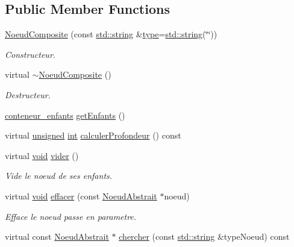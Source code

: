 \subsection*{Public Member Functions}
\begin{DoxyCompactItemize}
\item 
\hyperlink{group__inf2990_ga21f20f8612314721e4e63ea0596d0b42}{Noeud\-Composite} (const \hyperlink{glew_8h_ae84541b4f3d8e1ea24ec0f466a8c568b}{std\-::string} \&\hyperlink{fmod_8h_a5338b9cb3874378d7e5adfbe80a8a381}{type}=\hyperlink{glew_8h_ae84541b4f3d8e1ea24ec0f466a8c568b}{std\-::string}(\char`\"{}\char`\"{}))
\begin{DoxyCompactList}\small\item\em Constructeur. \end{DoxyCompactList}\item 
virtual \hyperlink{group__inf2990_gaada4bd846bd950f2ac186b09f35aa9c6}{$\sim$\-Noeud\-Composite} ()
\begin{DoxyCompactList}\small\item\em Destructeur. \end{DoxyCompactList}\item 
\hyperlink{class_noeud_composite_a697e52516e154d6943a1e1aa9533c317}{conteneur\-\_\-enfants} \hyperlink{class_noeud_composite_a920dcd848105559a42689d7e77d3f63d}{get\-Enfants} ()
\item 
virtual \hyperlink{_free_image_8h_a425076c7067a1b5166e2cc530e914814}{unsigned} \hyperlink{wglew_8h_a500a82aecba06f4550f6849b8099ca21}{int} \hyperlink{group__inf2990_gac2725a10b80438f67bb51076f13a78e1}{calculer\-Profondeur} () const 
\item 
virtual \hyperlink{wglew_8h_aeea6e3dfae3acf232096f57d2d57f084}{void} \hyperlink{group__inf2990_ga5e1564f2f07f5cd84cef7078ae88e3c6}{vider} ()
\begin{DoxyCompactList}\small\item\em Vide le noeud de ses enfants. \end{DoxyCompactList}\item 
virtual \hyperlink{wglew_8h_aeea6e3dfae3acf232096f57d2d57f084}{void} \hyperlink{group__inf2990_gabdc10574cb2b5c4825bc10b610fa9b5d}{effacer} (const \hyperlink{class_noeud_abstrait}{Noeud\-Abstrait} $\ast$noeud)
\begin{DoxyCompactList}\small\item\em Efface le noeud passe en parametre. \end{DoxyCompactList}\item 
virtual const \hyperlink{class_noeud_abstrait}{Noeud\-Abstrait} $\ast$ \hyperlink{group__inf2990_ga3bc273d5a3b1aed9e697bd2fa540403d}{chercher} (const \hyperlink{glew_8h_ae84541b4f3d8e1ea24ec0f466a8c568b}{std\-::string} \&type\-Noeud) const 

\end{DoxyCompactItemize}
